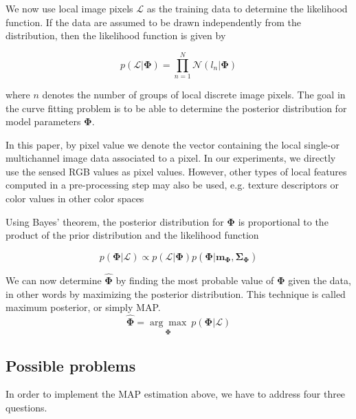 We now use local image pixels $\mathcal{L}$ as the training data to
determine the likelihood function. If the data are assumed to be drawn
independently from the distribution, then the likelihood function is
given by

\begin{equation}
  \label{eq:1.2}
p(\mathbf{\mathcal{L}} |\mathbf{\Phi}) = \prod_{n=1}^N \mathcal{N}(l_n | \mathbf{\Phi})
\end{equation}

where $n$ denotes the number of groups of local discrete image
pixels. The goal in the curve fitting problem is to be able to
determine the posterior distribution for model parameters
$\mathbf{\Phi}$. 

In this paper, by pixel value we denote the vector containing the local single-or multichannel
image data associated to a pixel. In our experiments, we directly use the sensed RGB
values as pixel values. However, other types of local features computed in a pre-processing
step may also be used, e.g. texture descriptors or color values in other color spaces

Using Bayes'
theorem, the posterior distribution for $\mathbf{\Phi}$ is
proportional to the product of the prior distribution and the
likelihood function

\begin{equation}
  \label{eq:1.3}
  p(\mathbf{\Phi}|\mathbf{\mathcal{L}}) \propto p(\mathbf{\mathcal{L}} |\mathbf{\Phi})p(\mathbf{\Phi} | \mathbf{m}_{\mathbf{\Phi}}, \mathbf{\mathbf{\Sigma}}_{\mathbf{\Phi}})
\end{equation}

We can now determine $\hat{\mathbf{\Phi}}$ by finding the most probable
value of $\mathbf{\Phi}$ given the data, in other words by maximizing
the posterior distribution. This technique is called maximum
posterior, or simply MAP.
\begin{equation}
  \label{eq:1.4}
  \hat{\mathbf{\Phi}} = \underset{\mathbf{\Phi}}{\arg\max} \ p(\mathbf{\Phi}|\mathbf{\mathcal{L}})
\end{equation}


\subsection{Possible problems}
\label{sec:prob}
In order to implement the MAP estimation above, we have to address
four three questions.

